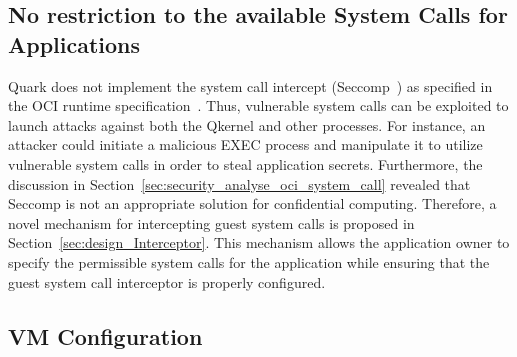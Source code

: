 
\subsection{No restriction to the available System Calls for Applications}

Quark does not implement the system call intercept (Seccomp~\cite*{seccomp}) as specified in the OCI runtime specification~\cite*{oci-runtime-spec}. Thus, vulnerable system calls can be exploited to launch attacks against both the Qkernel and other processes. For instance, an attacker could initiate a malicious EXEC process and manipulate it 
to utilize vulnerable system calls in order to steal application secrets. Furthermore, the discussion in Section~\ref{sec:security_analyse_oci_system_call} revealed that Seccomp is not an appropriate solution for confidential computing. Therefore, a novel mechanism for intercepting guest system calls is proposed in Section~\ref{sec:design_Interceptor}. This mechanism allows the 
application owner to specify the permissible system calls for the application while ensuring that the guest system call interceptor is properly configured. 




\subsection{VM Configuration}

